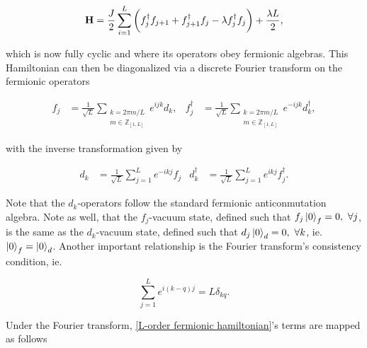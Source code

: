\documentclass{homework}
\begin{document}
\begin{equation}
    {\bf H} = \frac{J}{2} \sum_{i=1}^{L} \bigg(f_{j}^{\dagger} f_{j+1} + f_{j+1}^{\dagger} f_j - \lambda f_{j}^{\dagger} f_{j}\bigg) + \frac{\lambda L}{2},
    \label{L-order fermionic hamiltonian}
\end{equation}

which is now fully cyclic and where its operators obey fermionic algebras. This Hamiltonian can then be diagonalized via a discrete Fourier transform on the fermionic operators 

\begin{align}
    f_j &= \frac{1}{\sqrt{L}} \sum_{\substack{k = {2\pi m/L}\\
    m \in \mathds{Z}_{[1, L]} }}
                  e^{ijk} d_k, & f_j^{\dagger} &=\frac{1}{\sqrt{L}}  \sum_{\substack{k = {2\pi m/L}\\
    m \in \mathds{Z}_{[1, L]}}} e^{-ijk} d_k^{\dagger},
\end{align}

with the inverse transformation given by 

\begin{align}
    d_k &= \frac{1}{\sqrt{L}} \sum_{j=1}^{L}
                  e^{-ikj} f_j &  d_k^{\dagger} &= \frac{1}{\sqrt{L}} \sum_{j=1}^{L}
                  e^{ikj} f_j^{\dagger}.
\end{align}

Note that the $d_k$-operators follow the standard fermionic anticonmutation algebra. Note as well, that the $f_j$-vacuum state, defined such that $f_j \ket{0}_f = 0, \textnormal{ } \forall j$, is the same as the $d_k$-vacuum state, defined such that $d_j \ket{0}_d = 0, \textnormal{ } \forall k$, ie. $\ket{0}_f = \ket{0}_d$. Another important relationship is the Fourier transform's consistency condition, ie. 

$$
\sum_{j=1}^{L} e^{i(k-q)j} = L \delta_{kq}.
$$

Under the Fourier transform, \eqref{L-order fermionic hamiltonian}'s terms are mapped as follows 
\end{document}
